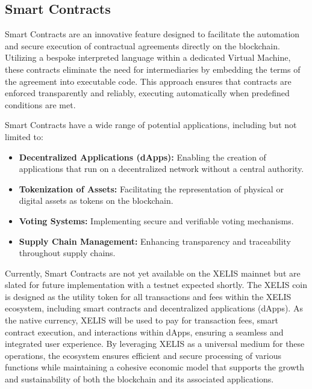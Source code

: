 \documentclass[12pt,a4paper,twocolumn]{article}
\begin{document}
\subsection{Smart Contracts}

Smart Contracts are an innovative feature designed to facilitate the automation and secure execution of contractual agreements directly on the blockchain. Utilizing a bespoke interpreted language within a dedicated Virtual Machine, these contracts eliminate the need for intermediaries by embedding the terms of the agreement into executable code. This approach ensures that contracts are enforced transparently and reliably, executing automatically when predefined conditions are met.

Smart Contracts have a wide range of potential applications, including but not limited to:\\

\begin{itemize}
\item \textbf{Decentralized Applications (dApps):} Enabling the creation of applications that run on a decentralized network without a central authority.

\item \textbf{Tokenization of Assets:} Facilitating the representation of physical or digital assets as tokens on the blockchain.

\item \textbf{Voting Systems:} Implementing secure and verifiable voting mechanisms.

\item \textbf{Supply Chain Management:} Enhancing transparency and traceability throughout supply chains.\\
\end{itemize}

Currently, Smart Contracts are not yet available on the XELIS mainnet but are slated for future implementation with a testnet expected shortly. The XELIS coin is designed as the utility token for all transactions and fees within the XELIS ecosystem, including smart contracts and decentralized applications (dApps). As the native currency, XELIS will be used to pay for transaction fees, smart contract execution, and interactions within dApps, ensuring a seamless and integrated user experience. By leveraging XELIS as a universal medium for these operations, the ecosystem ensures efficient and secure processing of various functions while maintaining a cohesive economic model that supports the growth and sustainability of both the blockchain and its associated applications.
\end{document}
